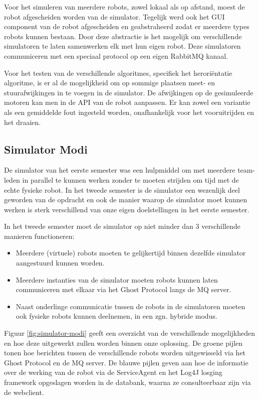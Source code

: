\documentclass[12pt,a4paper]{report}
\begin{document}
Voor het simuleren van meerdere robots, zowel lokaal als op afstand, moest de robot afgescheiden worden van de simulator. Tegelijk werd ook het GUI component van de robot afgescheiden en geabstraheerd zodat er meerdere types robots kunnen bestaan. Door deze abstractie is het mogelijk om verschillende simulatoren te laten samenwerken elk met hun eigen robot. Deze simulatoren communiceren met een speciaal protocol op een eigen RabbitMQ kanaal.

Voor het testen van de verschillende algoritmes, specifiek het herori\"entatie algoritme, is er al de mogelijkheid om op sommige plaatsen meet- en stuurafwijkingen in te voegen in de simulator. De afwijkingen op de gesimuleerde motoren kan men in de API van de robot aanpassen. Er kan zowel een variantie als een gemiddelde fout ingesteld worden, onafhankelijk voor het vooruitrijden en het draaien.

\subsection{Simulator Modi}

De simulator van het eerste semester was een hulpmiddel om met meerdere team-leden in parallel te kunnen werken zonder te moeten strijden om tijd met de echte fysieke robot. In het tweede semester is de simulator een wezenlijk deel geworden van de opdracht en ook de manier waarop de simulator moet kunnen werken is sterk verschillend van onze eigen doelstellingen in het eerste semester.

In het tweede semester moet de simulator op niet minder dan 3 verschillende manieren functioneren:

\begin{itemize}
\item Meerdere (virtuele) robots moeten te gelijkertijd binnen dezelfde simulator aangestuurd kunnen worden.
\item Meerdere instanties van de simulator moeten robots kunnen laten communiceren met elkaar via het Ghost Protocol langs de MQ server.
\item Naast onderlinge communicatie tussen de robots in de simulatoren moeten ook fysieke robots kunnen deelnemen, in een zgn. hybride modus.
\end{itemize}

Figuur \ref{fig:simulator-modi} geeft een overzicht van de verschillende mogelijkheden en hoe deze uitgewerkt zullen worden binnen onze oplossing. De groene pijlen tonen hoe berichten tussen de verschillende robots worden uitgewisseld via het Ghost Protocol en de MQ server. De blauwe pijlen geven aan hoe de informatie over de werking van de robot via de ServiceAgent en het Log4J losging framework opgeslagen worden in de databank, waarna ze consulteerbaar zijn via de webclient.
\end{document}
